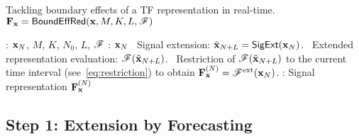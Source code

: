 \begin{algorithm}
\caption{Tackling boundary effects of a TF representation in real-time. ${\mathbf F}_{\mathbf x} = \relax{\sf BoundEffRed}({\mathbf x},M,K,L,{\mathscr F})$}
\label{alg:boundary}
\begin{algorithmic}
: ${\mathbf x}_{N}$, $M$, $K$, $N_0$, $L$, ${\mathscr F}$
\STATE \vspace{-2mm}
: ${\mathbf x}_N$
\STATE \vspace{-2mm}
\STATE \quad\textbullet\ Signal extension: $\tilde{{\mathbf x}}_{N+L} = \relax{\sf SigExt}({\mathbf x}_N)$. 
\STATE \quad\textbullet\ Extended representation evaluation: ${\mathscr F}(\tilde{{\mathbf x}}_{N+L})$.
\STATE \quad\textbullet\ Restriction of ${\mathscr F}(\tilde{{\mathbf x}}_{N+L})$ to the current time interval (see~\eqref{eq:restriction}) to obtain ${\mathbf F}_{\mathbf x}^{(N)}={\mathscr F}^{\mathrm{ext}}({\mathbf x}_N)$.
\STATE \vspace{-2mm}
: Signal representation ${\mathbf F}_{\mathbf x}^{(N)}$
\ENDWHILE
\end{algorithmic}
\end{algorithm}


\subsection{Step 1: Extension by Forecasting}



